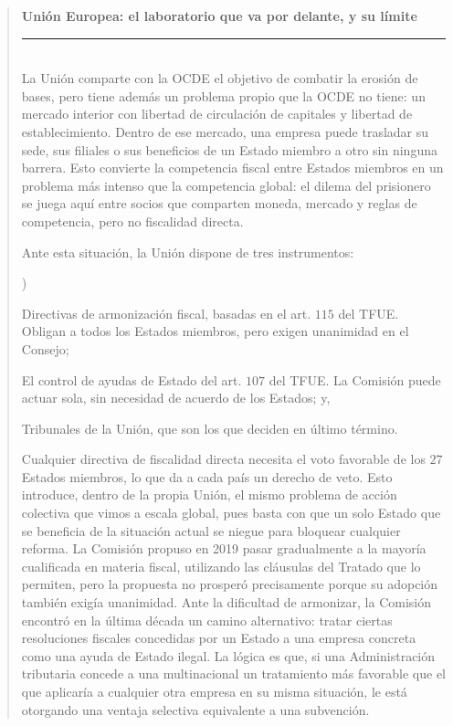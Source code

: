 \documentclass[10pt,a4paper]{article}
\newcounter{alphaitem}
\newenvironment{la}
      {\begin{list}{\alph{alphaitem})}{%
          \usecounter{alphaitem}%
          \setlength{\leftmargin}{1cm}%
          \setlength{\parskip}{3pt}%
          \setlength{\itemsep}{0pt}%
          \setlength{\parsep}{0pt}%
      }}
      {\end{list}}
\newenvironment{specialblock}[1]{%
      \begin{quote} %
      \small %
      \noindent\textbf{#1}\\[-0.3em] %
      \rule{\linewidth}{0.4pt}\\[0.6em]}{
      \end{quote}}
\begin{document}
\begin{specialblock}{\textbf{Unión Europea}: el laboratorio que va por delante, y su límite}
    La Unión comparte con la OCDE el objetivo de combatir la erosión de bases, pero tiene además un problema propio que la OCDE no tiene: un mercado interior con libertad de circulación de capitales y libertad de establecimiento. Dentro de ese mercado, una empresa puede trasladar su sede, sus filiales o sus beneficios de un Estado miembro a otro sin ninguna barrera. Esto convierte la competencia fiscal entre Estados miembros en un problema más intenso que la competencia global: el dilema del prisionero se juega aquí entre socios que comparten moneda, mercado y reglas de competencia, pero no fiscalidad directa. 
    
    Ante esta situación, la Unión dispone de tres instrumentos:
    \begin{la}
        \item Directivas de armonización fiscal, basadas en el art. $115$ del TFUE. Obligan a todos los Estados miembros, pero exigen unanimidad en el Consejo;
        \item El control de ayudas de Estado del art. $107$ del TFUE. La Comisión puede actuar sola, sin necesidad de acuerdo de los Estados; y,
        \item Tribunales de la Unión, que son los que deciden en último término.
    \end{la}

    Cualquier directiva de fiscalidad directa necesita el voto favorable de los $27$ Estados miembros, lo que da a cada país un derecho de veto. Esto introduce, dentro de la propia Unión, el mismo problema de acción colectiva que vimos a escala global, pues basta con que un solo Estado que se beneficia de la situación actual se niegue para bloquear cualquier reforma. La Comisión propuso en 2019 pasar gradualmente a la mayoría cualificada en materia fiscal, utilizando las cláusulas del Tratado que lo permiten, pero la propuesta no prosperó precisamente porque su adopción también exigía unanimidad. Ante la dificultad de armonizar, la Comisión encontró en la última década un camino alternativo: tratar ciertas resoluciones fiscales concedidas por un Estado a una empresa concreta como una ayuda de Estado ilegal. La lógica es que, si una Administración tributaria concede a una multinacional un tratamiento más favorable que el que aplicaría a cualquier otra empresa en su misma situación, le está otorgando una ventaja selectiva equivalente a una subvención.
    

\end{specialblock}
\end{document}
